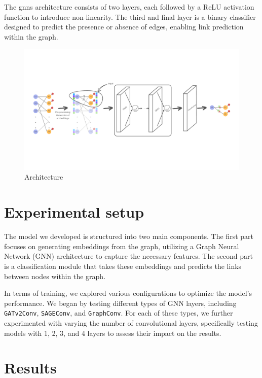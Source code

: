 \documentclass[11pt]{article}
\begin{document}
The \acp{gnn} architecture consists of two layers, each followed by a ReLU activation 
function to introduce non-linearity. The third and final layer is a binary classifier 
designed to predict the presence or absence of edges, enabling link prediction within the 
graph.



\begin{figure}
  \centering
  \includegraphics[width=1\linewidth]{figures/architecture.pdf}

  \caption{
    Architecture
  }
  \label{fig:architecture}
\end{figure}

\section{Experimental setup}\label{sec:experimental-setup}

The model we developed is structured into two main components. 
%
The first part focuses on generating embeddings from the graph, 
  utilizing a Graph Neural Network (GNN) architecture to capture the necessary features. 
%  
The second part is a classification module that takes these embeddings and predicts the links 
  between nodes within the graph.

In terms of training, we explored various configurations to optimize the model's performance.
%
We began by testing different types of GNN layers, including \texttt{GATv2Conv}, \texttt{SAGEConv}, and \texttt{GraphConv}. 
%
For each of these types, we further experimented with varying the number of convolutional layers, 
  specifically testing models with 1, 2, 3, and 4 layers to assess their impact on the results.

\section{Results}\label{sec:resutls}
\end{document}
